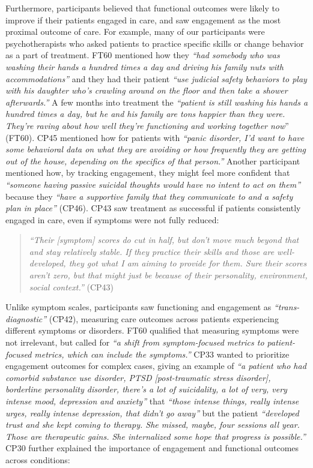 Furthermore, participants believed that functional outcomes were likely to improve if their patients engaged in care, and saw engagement as the most proximal outcome of care.
For example, many of our participants were psychotherapists who asked patients to practice specific skills or change behavior as a part of treatment.
FT60 mentioned how they \textit{``had somebody who was washing their hands a hundred times a day and driving his family nuts with accommodations''} and they had their patient \textit{``use judicial safety behaviors to play with his daughter who's crawling around on the floor and then take a shower afterwards.''}
A few months into treatment the \textit{``patient is still washing his hands a hundred times a day, but he and his family are tons happier than they were. They're raving about how well they're functioning and working together now}'' (FT60).
CP45 mentioned how for patients with \textit{``panic disorder, I'd want to have some behavioral data on what they are avoiding or how frequently they are getting out of the house, depending on the specifics of that person.''}
Another participant mentioned how, by tracking engagement, they might feel more confident that \textit{``someone having passive suicidal thoughts would have no intent to act on them''} because they \textit{``have a supportive family that they communicate to and a safety plan in place''} (CP46).
CP43 saw treatment as successful if patients consistently engaged in care, even if symptoms were not fully reduced:

\begin{quote}
   \textit{``Their [symptom] scores do cut in half, but don't move much beyond that and stay relatively stable. 
   If they practice their skills and those are well-developed, they got what I am aiming to provide for them.
   Sure their scores aren't zero, but that might just be because of their personality, environment, social context.''} (CP43)
\end{quote}

Unlike symptom scales, participants saw functioning and engagement as \textit{``trans-diagnostic''} (CP42), measuring care outcomes across patients experiencing different symptoms or disorders.
FT60 qualified that measuring symptoms were not irrelevant, but called for \textit{``a shift from symptom-focused metrics to patient-focused metrics, which can include the symptoms.''}
CP33 wanted to prioritize engagement outcomes for complex cases, giving an example of \textit{``a patient who had comorbid substance use disorder, PTSD [post-traumatic stress disorder], borderline personality disorder, there's a lot of suicidality, a lot of very, very intense mood, depression and anxiety''} that \textit{``those intense things, really intense urges, really intense depression, that didn't go away''} but the patient \textit{``developed trust and she kept coming to therapy. She missed, maybe, four sessions all year. Those are therapeutic gains. She internalized some hope that progress is possible.''}
CP30 further explained the importance of engagement and functional outcomes across conditions:

